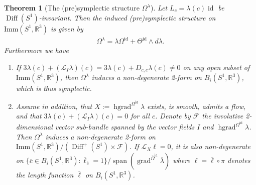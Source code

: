 \documentclass[12pt]{amsart}
\newcommand{\rev}[1]{#1}
\newtheorem{theorem}{Theorem}[section]
\theoremstyle{definition}
\newcommand{\R}{\mathbb R}
\newcommand{\Diff}{\operatorname{Diff}(S^1)}
\newcommand{\Diffp}{\operatorname{Diff}^+(S^1)}
\newcommand{\id}{\mathrm{id}}
\newcommand{\Imm}{\mathrm{Imm}}
\def\la{\lambda}
\def\Th{\Theta}
\def\Om{\Omega}
\def\o{\operatorname{\circ}}
\def\x{\times}
\def\L{\mathcal{L}}
\def\R{{\mathbb R}}
\let\on=\operatorname
\begin{document}
\begin{theorem}[The (pre)symplectic structure $\Omega^\la$]\label{thm:sympl_conf}
 Let $L_c=\la(c)\operatorname{id}$ be $\Diff$-invariant. Then the induced (pre)symplectic structure on $\Imm(S^1,\mathbb R^3)$ is given by
    \begin{align}\label{eq:Om_lambda}
        \Omega^\la=\la \Omega^\id + \Th^\id\wedge d\la.
    \end{align}
Furthermore we have
\begin{enumerate}[label=(\alph*)]
\item \label{thm:sympl_conf:casea}
If $3\rev{\la(c)} + (\L_I\la)\rev{(c)}=3\la(c)+D_{c,c}\la(c)\neq 0$ on any open subset of $\Imm(S^1,\R^3)$, then  $\Omega^\la$ induces a non-degenerate 2-form on $B_i(S^1,\R^3)$, which is thus symplectic.
\item \label{thm:sympl_conf:caseb} Assume in addition,  that $X:=\on{hgrad}^{\Om^\id}\la$ exists, is smooth, \rev{admits a  flow}, and that $3\la\rev{(c)} + (\L_I\la)\rev{(c)} =0$ for all $c$. 
Denote by $\mathcal F$ the involutive 2-dimensional vector sub-bundle spanned by the vector fields $I$ and $\on{hgrad}^{\Om^\id}\la$.  
Then $\Om^\la$  induces a non-degenerate 2-form on 
$\Imm(S^1,\mathbb R^3)/(\Diffp \x \mathcal F
)$. \rev{If $\L_X\ell = 0$,} 
it is also non-degenerate on $\{\bar c\in B_i(S^1,\R^3): \bar\ell_{\bar c}=1\}/\on{span}(\on{grad}^{\bar\Om^\id}\bar\la)$ \rev{where $\ell =\bar\ell\o \pi$ denotes the length function $\bar\ell$ on $B_i(S^1,\R^3)$.} 
\end{enumerate}
\end{theorem}
\end{document}
